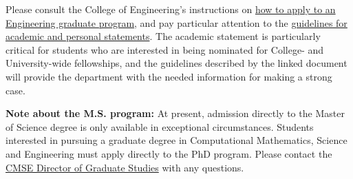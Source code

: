 Please consult the College of Engineering's instructions on
\href{http://www.egr.msu.edu/academics/graduate/how-to-apply}{how to
apply to an Engineering graduate program}, and pay particular
attention to the
\href{http://www.egr.msu.edu/academics/graduate/academic-personal-statements-guidelines/}{guidelines
for academic and personal statements}.  The academic statement is
particularly critical for students who are interested in being
nominated for College- and University-wide fellowships, and the
guidelines described by the linked document will provide the
department with the needed information for making a strong case.

\vspace{3mm}
\noindent \textbf{Note about the M.S. program:} At present, admission
directly to the Master of Science degree is only available in
exceptional circumstances.  Students interested in pursuing a graduate
degree in Computational Mathematics, Science and Engineering must
apply directly to the PhD program.  Please contact the
\href{mailto:cmsegrad@msu.edu}{CMSE Director of Graduate Studies} with
any questions.
